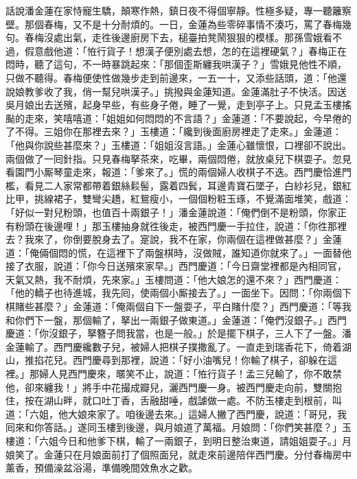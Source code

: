 話說潘金蓮在家恃寵生驕，顛寒作熱，鎮日夜不得個寧靜。性極多疑，專一聽籬察壁。那個春梅，又不是十分耐煩的。一日，金蓮為些零碎事情不湊巧，罵了春梅幾句。春梅沒處出氣，走徃後邊廚房下去，槌臺拍凳鬧狠狠的模樣。那孫雪娥看不過，假意戲他道：「恠行貨子！想漢子便別處去想，怎的在這裡硬氣？」{}春梅正在悶時，聽了這句，不一時暴跳起來：「那個歪斯纏我哄漢子？」雪娥見他性不順，只做不聽得。春梅便使性做幾步走到前邊來，一五一十，又添些話頭，道：「他還說娘教爹收了我，俏一幫兒哄漢子。」挑撥與金蓮知道。金蓮滿肚子不快活。因送吳月娘出去送殯，起身早些，有些身子倦，睡了一覺，走到亭子上。只見孟玉樓搖颭的走來，{}笑嘻嘻道：「姐姐如何悶悶的不言語？」金蓮道：「不要說起，今早倦的了不得。三姐你在那裡去來？」玉樓道：「纔到後面廚房裡走了走來。」金蓮道：「他與你說些甚麼來？」玉樓道：「姐姐沒言語。」金蓮心雖懷恨，口裡卻不說出。兩個做了一囘針指。只見春梅拏茶來，吃畢，兩個悶倦，就放桌兒下棋耍子。忽見看園門小厮琴童走來，{}報道：「爹來了。」慌的兩個婦人收棋子不迭。西門慶恰進門檻，看見二人家常都帶着銀絲鬏髻，露着四鬂，耳邊青寶石墜子，白紗衫兒，銀紅比甲，挑線裙子，雙彎尖趫，紅鴛瘦小，一個個粉粧玉琢，不覺滿面堆笑，戲道：「好似一對兒粉頭，也值百十兩銀子！」潘金蓮說道：「俺們倒不是粉頭，你家正有粉頭在後邊哩！」{}那玉樓抽身就徃後走，被西門慶一手拉住，說道：「你徃那裡去？我來了，你倒要脫身去了。寔說，我不在家，你兩個在這裡做甚麼？」金蓮道：「俺倆個悶的慌，在這裡下了兩盤棋時，沒做賊，誰知道你就來了。」一面替他接了衣服，說道：「你今日送殯來家早。」西門慶道：「今日齋堂裡都是內相同官，天氣又熱，我不耐煩，先來家。」玉樓問道：「他大娘怎的還不來？」西門慶道：「他的轎子也待進城，我先囘，使兩個小厮接去了。」一面坐下。因問：「你兩個下棋賭些甚麼？」金蓮道：「俺兩個自下一盤耍子，平白賭什麼？」西門慶道：「等我和你們下一盤，那個輸了，拏出一兩銀子做東道。」金蓮道：「俺們沒銀子。」西門慶道：「你沒銀子，拏簪子問我當，也是一般。」於是擺下棋子，三人下了一盤。潘金蓮輸了。{}西門慶纔數子兒，被婦人把棋子撲撒亂了。一直走到瑞香花下，倚着湖山，推掐花兒。西門慶尋到那裡，說道：「好小油嘴兒！你輸了棋子，卻躲在這裡。」那婦人見西門慶來，暱笑不止，說道：「恠行貨子！孟三兒輸了，你不敢禁他，卻來纏我！」將手中花撮成瓣兒，灑西門慶一身。{}被西門慶走向前，雙關抱住，按在湖山畔，就口吐丁香，舌融甜唾，戲謔做一處。不防玉樓走到根前，叫道：「六姐，他大娘來家了。咱後邊去來。」這婦人撇了西門慶，說道：「哥兒，我囘來和你答話。」{}遂同玉樓到後邊，與月娘道了萬福。月娘問：「你們笑甚麼？」玉樓道：「六姐今日和他爹下棋，輸了一兩銀子，到明日整治東道，請姐姐耍子。」月娘笑了。金蓮只在月娘面前打了個照面兒，就走來前邊陪伴西門慶。分付春梅房中薰香，預備澡盆浴湯，準備晚間效魚水之歡。

